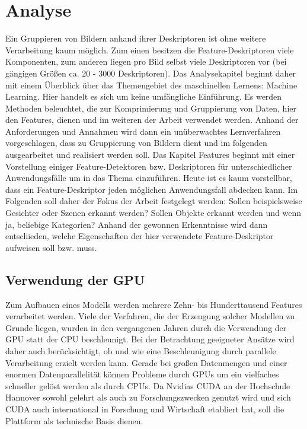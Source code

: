\chapter{Analyse}

 Ein Gruppieren von Bildern anhand ihrer Deskriptoren ist ohne weitere Verarbeitung kaum möglich. Zum einen besitzen die Feature-Deskriptoren viele Komponenten, zum anderen liegen pro Bild selbst viele Deskriptoren vor (bei gängigen Größen ca. 20 - 3000 Deskriptoren).
Das Analysekapitel beginnt daher mit einem Überblick über das Themengebiet des maschinellen Lernens: Machine Learning. Hier handelt es sich um keine umfängliche Einführung. Es werden Methoden beleuchtet, die zur Komprimierung und Gruppierung von Daten, hier den Features, dienen und im weiteren der Arbeit verwendet werden. Anhand der Anforderungen und Annahmen wird dann ein unüberwachtes Lernverfahren vorgeschlagen, dass zu Gruppierung von Bildern dient und im folgenden ausgearbeitet und realisiert werden soll.
Das Kapitel Features beginnt mit einer Vorstellung einiger Feature-Detektoren bzw. Deskriptoren für unterschiedlicher Anwendungsfälle um in das Thema einzuführen. Heute ist es kaum vorstellbar, dass ein Feature-Deskriptor jeden möglichen Anwendungsfall abdecken kann. Im Folgenden soll daher der Fokus der Arbeit festgelegt werden: Sollen beispielsweise Gesichter oder Szenen erkannt werden? Sollen Objekte erkannt werden und wenn ja, beliebige Kategorien? Anhand der gewonnen Erkenntnisse wird dann entschieden, welche Eigenschaften der hier verwendete Feature-Deskriptor aufweisen soll bzw. muss. 

\section{Verwendung der GPU}

Zum Aufbauen eines Modells werden mehrere Zehn- bis Hunderttausend Features verarbeitet werden. Viele der Verfahren, die der Erzeugung solcher Modellen zu Grunde liegen, wurden in den vergangenen Jahren durch die Verwendung der GPU statt der CPU beschleunigt. Bei der Betrachtung geeigneter Ansätze wird daher auch berücksichtigt, ob und wie eine Beschleunigung durch parallele Verarbeitung erzielt werden kann. Gerade bei großen Datenmengen und einer enormen Datenparallelität können Probleme durch GPUs um ein vielfaches schneller gelöst werden als durch CPUs. Da Nvidias CUDA an der Hochschule Hannover sowohl gelehrt als auch zu Forschungszwecken genutzt wird und sich CUDA auch international in Forschung und Wirtschaft etabliert hat, soll die Plattform als technische Basis dienen. 

